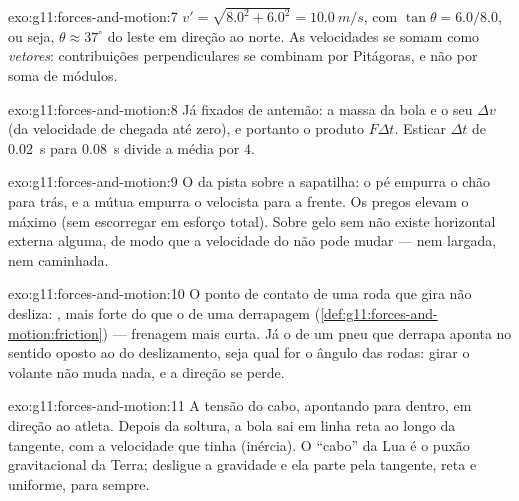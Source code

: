 \begin{solution}{exo:g11:forces-and-motion:7}
$v' = \sqrt{8.0^2 + 6.0^2} = \qty{10.0}{m/s}$, com
$\tan\theta = 6.0/8.0$, ou seja, $\theta \approx 37^\circ$ do leste em
direção ao norte. As velocidades se somam como \emph{vetores}:
contribuições perpendiculares se combinam por Pitágoras, e não por soma
de módulos.
\end{solution}

\begin{solution}{exo:g11:forces-and-motion:8}
Já fixados de antemão: a massa da bola e o seu $\Delta v$ (da velocidade
de chegada até zero), e portanto o produto $F\Delta t$. Esticar
$\Delta t$ de \qty{0.02}{s} para \qty{0.08}{s} divide a  média por
$4$.
\end{solution}

\begin{solution}{exo:g11:forces-and-motion:9}
O  da pista sobre a sapatilha: o pé empurra o chão para
trás, e a  mútua empurra o velocista para a frente. Os
pregos elevam o  máximo (sem escorregar em esforço
total). Sobre gelo sem  não existe  horizontal externa alguma,
de modo que a velocidade do  não pode mudar --- nem
largada, nem caminhada.
\end{solution}

\begin{solution}{exo:g11:forces-and-motion:10}
O ponto de contato de uma roda que gira não desliza: ,
mais forte do que o  de uma derrapagem
(\cref{def:g11:forces-and-motion:friction}) --- frenagem mais curta. Já o
 de um pneu que derrapa aponta no sentido oposto ao do
deslizamento, seja qual for o ângulo das rodas: girar o volante não muda
nada, e a direção se perde.
\end{solution}

\begin{solution}{exo:g11:forces-and-motion:11}
A tensão do cabo, apontando para dentro, em direção ao atleta. Depois da
soltura, a bola sai em linha reta ao longo da tangente, com a velocidade
que tinha (inércia). O ``cabo'' da Lua é o puxão gravitacional da Terra;
desligue a gravidade e ela parte pela tangente, reta e uniforme, para
sempre.
\end{solution}

